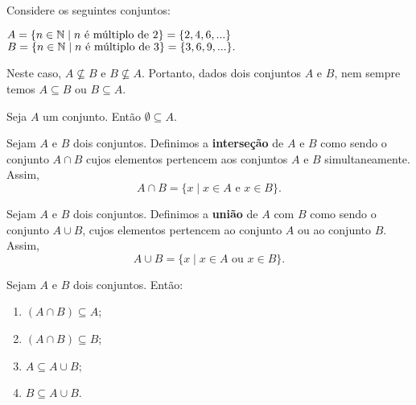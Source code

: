 \documentclass{beamer}
\begin{document}
    \begin{frame}
        Considere os seguintes conjuntos:\pause
        \begin{center}
            $A = \{ n \in \mathbb{N} \mid n \mbox{ é múltiplo de } 2\} = \{2,4,6,...\}$\pause\\
            $B = \{n \in \mathbb{N} \mid n \mbox{ é múltiplo de } 3\} = \{3,6,9,...\}.$\pause
        \end{center}

        Neste caso, $A \nsubseteq B$ \pause e $B \nsubseteq A$. \pause Portanto, dados dois conjuntos $A$ e $B$, nem sempre
        temos $A \subseteq B$ \pause ou $B \subseteq A$.\pause

        \begin{proposicao}
            Seja $A$ um conjunto. \pause Então $ \emptyset \subseteq A$.
        \end{proposicao}
    \end{frame}

        \begin{frame}
        \begin{definicao}
            Sejam $A$ e $B$ dois conjuntos. \pause Definimos a \textbf{interseção} de $A$ e $B$ \pause como sendo o conjunto $A \cap B$ \pause cujos elementos pertencem aos conjuntos $A$ e $B$ simultaneamente. \pause Assim,
            \[
                A \cap B = \{x \mid x \in A\mbox{ e }  x \in B\}.
            \]
        \end{definicao}

    \end{frame}

    \begin{frame}
        \begin{definicao}
            Sejam $A$ e $B$ dois conjuntos. \pause Definimos a \textbf{união} de $A$ com $B$ \pause como sendo o conjunto $A \cup B$, \pause cujos elementos pertencem ao conjunto $A$ ou ao conjunto $B$. \pause Assim,\pause
            \[
                A \cup B = \{x \mid x \in A \mbox{ ou } x \in B\}.
            \]
        \end{definicao}
    \end{frame}

    \begin{frame}
        \begin{proposicao} Sejam $A$ e $B$ dois conjuntos. \pause Então:\pause
            \begin{enumerate}[label={\roman*})]
                \item $(A \cap B) \subseteq A$;\pause
                \item $(A \cap B) \subseteq B$;\pause
                \item $A \subseteq A \cup B$;\pause
                \item $B \subseteq A \cup B$.
            \end{enumerate}
        \end{proposicao}
    \end{frame}
\end{document}
